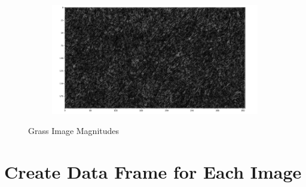 \documentclass[
  letterpaper,
  DIV=11,
  numbers=noendperiod]{scrreprt}
\newenvironment{Shaded}{\begin{snugshade}}{\end{snugshade}}
\newcommand{\AttributeTok}[1]{\textcolor[rgb]{0.40,0.45,0.13}{#1}}
\newcommand{\CommentTok}[1]{\textcolor[rgb]{0.37,0.37,0.37}{#1}}
\newcommand{\DecValTok}[1]{\textcolor[rgb]{0.68,0.00,0.00}{#1}}
\newcommand{\FunctionTok}[1]{\textcolor[rgb]{0.28,0.35,0.67}{#1}}
\newcommand{\NormalTok}[1]{\textcolor[rgb]{0.00,0.23,0.31}{#1}}
\newcommand{\OtherTok}[1]{\textcolor[rgb]{0.00,0.23,0.31}{#1}}
\newcommand{\SpecialCharTok}[1]{\textcolor[rgb]{0.37,0.37,0.37}{#1}}
\begin{document}
\begin{figure}
\begin{minipage}{0.33\linewidth}
\begin{figure}[H]
{}


\end{figure}%

\end{minipage}%
%
\begin{minipage}{0.33\linewidth}

\begin{figure}[H]

{\centering \includegraphics{images/plots/grass/close_up_living_lab_grass_mag.png}

}


\end{figure}%

\end{minipage}%

\caption{\label{fig-grass-mags}Grass Image Magnitudes}

\end{figure}%

\section{Create Data Frame for Each
Image}\label{create-data-frame-for-each-image-1}

\begin{Shaded}
\end{Shaded}
\end{document}
